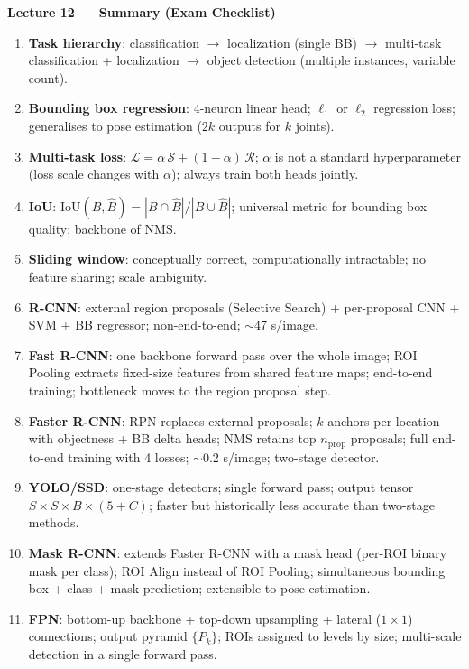 \documentclass[11pt,a4paper]{article}
\begin{document}
\begin{tcolorbox}[colback=WarningRedBg,colframe=WarningRed,boxrule=0.8pt,arc=3pt]
\textbf{Lecture 12 — Summary (Exam Checklist)}
\begin{enumerate}
  \item \textbf{Task hierarchy}: classification $\to$ localization (single BB) $\to$ multi-task classification + localization $\to$ object detection (multiple instances, variable count).
  \item \textbf{Bounding box regression}: 4-neuron linear head; $\ell_1$ or $\ell_2$ regression loss; generalises to pose estimation ($2k$ outputs for $k$ joints).
  \item \textbf{Multi-task loss}: $\mathcal{L} = \alpha\,\mathcal{S} + (1-\alpha)\,\mathcal{R}$; $\alpha$ is not a standard hyperparameter (loss scale changes with $\alpha$); always train both heads jointly.
  \item \textbf{IoU}: $\mathrm{IoU}(B, \hat{B}) = |B\cap\hat{B}|/|B\cup\hat{B}|$; universal metric for bounding box quality; backbone of NMS.
  \item \textbf{Sliding window}: conceptually correct, computationally intractable; no feature sharing; scale ambiguity.
  \item \textbf{R-CNN}: external region proposals (Selective Search) + per-proposal CNN + SVM + BB regressor; non-end-to-end; $\sim$47 s/image.
  \item \textbf{Fast R-CNN}: one backbone forward pass over the whole image; ROI Pooling extracts fixed-size features from shared feature maps; end-to-end training; bottleneck moves to the region proposal step.
  \item \textbf{Faster R-CNN}: RPN replaces external proposals; $k$ anchors per location with objectness + BB delta heads; NMS retains top $n_\text{prop}$ proposals; full end-to-end training with 4 losses; $\sim$0.2 s/image; two-stage detector.
  \item \textbf{YOLO/SSD}: one-stage detectors; single forward pass; output tensor $S\times S\times B\times(5+C)$; faster but historically less accurate than two-stage methods.
  \item \textbf{Mask R-CNN}: extends Faster R-CNN with a mask head (per-ROI binary mask per class); ROI Align instead of ROI Pooling; simultaneous bounding box + class + mask prediction; extensible to pose estimation.
  \item \textbf{FPN}: bottom-up backbone + top-down upsampling + lateral ($1\times1$) connections; output pyramid $\{P_k\}$; ROIs assigned to levels by size; multi-scale detection in a single forward pass.
\end{enumerate}
\end{tcolorbox}
\end{document}
